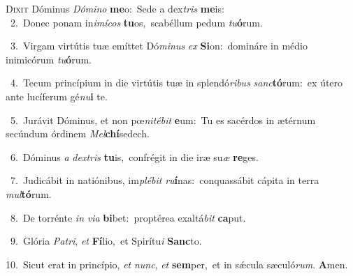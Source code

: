\lettrine{\initial\textcolor{\initialcolor}{D}}{ixit} Dóminus \textit{Dó}\-\textit{mi}\textit{no} \textbf{me}\-o:~\star Sede a dex\textit{tris} \textbf{me}\-is:\\
{\numbfont\textcolor{\numbcolor}{~2.}}~Donec ponam in\-\textit{i}\-\textit{mí}\textit{cos} \textbf{tu}\-os,~\star scabéllum pedum \textit{tu}\-\textbf{ó}rum.\par
{\numbfont\textcolor{\numbcolor}{~3.}}~Virgam virtútis tuæ emíttet Dó\-\textit{mi}\-\textit{nus} \textit{ex} \textbf{Si}\-on:~\star domináre in médio inimicórum \textit{tu}\-\textbf{ó}rum.\par
{\numbfont\textcolor{\numbcolor}{~4.}}~Tecum princípium in die virtútis tuæ in splendó\-\textit{ri}\-\textit{bus} \textit{sanc}\-\textbf{tó}rum:~\star ex útero ante lucíferum gé\-\textit{nu}\-\textbf{i} te.\par
{\numbfont\textcolor{\numbcolor}{~5.}}~Jurávit Dóminus, et non pœ\-\textit{ni}\-\textit{té}\textit{bit} \textbf{e}\-um:~\star Tu es sacérdos in ætérnum secúndum órdinem \textit{Mel}\-\textbf{chí}sedech.\par
{\numbfont\textcolor{\numbcolor}{~6.}}~Dóminus \textit{a} \textit{dex}\-\textit{tris} \textbf{tu}\-is,~\star confrégit in die iræ su\textit{æ} \textbf{re}\-ges.\par
{\numbfont\textcolor{\numbcolor}{~7.}}~Judicábit in natiónibus, im\-\textit{plé}\-\textit{bit} \textit{ru}\-\textbf{í}nas:~\star conquassábit cápita in terra \textit{mul}\-\textbf{tó}rum.\par
{\numbfont\textcolor{\numbcolor}{~8.}}~De torrénte \textit{in} \textit{vi}\-\textit{a} \textbf{bi}\-bet:~\star proptérea exaltá\textit{bit} \textbf{ca}\-put.\par
{\numbfont\textcolor{\numbcolor}{~9.}}~Glória \textit{Pa}\-\textit{tri}, \textit{et} \textbf{Fí}\-lio,~\star et Spirítu\textit{i} \textbf{Sanc}\-to.\par
{\numbfont\textcolor{\numbcolor}{10.}}~Sicut erat in princípio, \textit{et} \textit{nunc}\-, \textit{et} \textbf{sem}\-per,~\star et in sǽcula sæculó\-\textit{rum}\-. \textbf{A}\-men.\par
